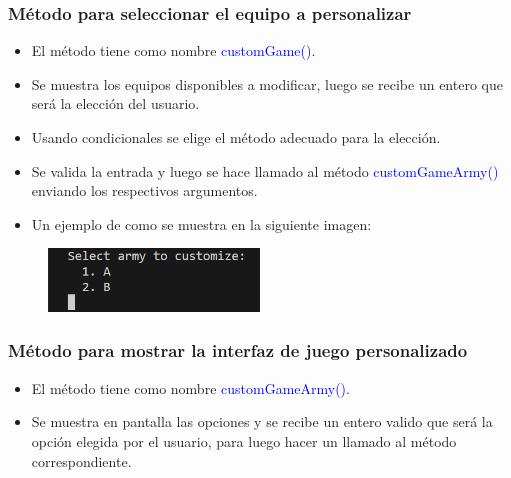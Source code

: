 \documentclass{article}
\begin{document}
\subsubsection{Método para seleccionar el equipo a personalizar}
\begin{itemize}
    \item El método tiene como nombre \textcolor{blue}{customGame()}.
    \item Se muestra los equipos disponibles a modificar, luego se recibe un entero que será la elección del usuario.
    \item Usando condicionales se elige el método adecuado para la elección.
    \item Se valida la entrada y luego se hace llamado al método \textcolor{blue}{customGameArmy()} enviando los respectivos argumentos.
\end{itemize}

\begin{itemize}\begin{itemize}\item Un ejemplo de como se muestra en la siguiente imagen:
\end{itemize}\end{itemize}
\begin{figure}[H]
    \centering
    \includegraphics[width=0.5\textwidth,keepaspectratio]{img/12customGame.png}
    \caption{}
\end{figure}


\subsubsection{Método para mostrar la interfaz de juego personalizado}
\begin{itemize}
    \item El método tiene como nombre \textcolor{blue}{customGameArmy()}.
    \item Se muestra en pantalla las opciones y se recibe un entero valido que será la opción elegida por el usuario, para luego hacer un llamado al método correspondiente.
\end{itemize}

\end{document}
